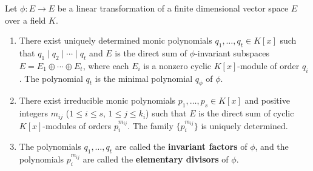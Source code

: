 Let $\phi : E \to E$ be a linear transformation of a finite dimensional vector space $E$ over a field $K$.
\begin{enumerate}
\item There exist uniquely determined monic polynomials $q_1, \ldots, q_t \in K[x]$ such that $q_1 \mid q_2 \mid \cdots \mid q_t$ and $E$ is the direct sum of $\phi$-invariant subspaces $E = E_1 \oplus \cdots \oplus E_t$, where each $E_i$ is a nonzero cyclic $K[x]$-module of order $q_i$. The polynomial $q_t$ is the minimal polynomial $q_\phi$ of $\phi$.

\item There exist irreducible monic polynomials $p_1, \ldots, p_s \in K[x]$ and positive integers $m_{ij}$ ($1 \le i \le s$, $1 \le j \le k_i$) such that $E$ is the direct sum of cyclic $K[x]$-modules of orders $p_i^{m_{ij}}$. The family $\{p_i^{m_{ij}}\}$ is uniquely determined.

\item The polynomials $q_1, \ldots, q_t$ are called the \textbf{invariant factors} of $\phi$, and the polynomials $p_i^{m_{ij}}$ are called the \textbf{elementary divisors} of $\phi$.
\end{enumerate}
